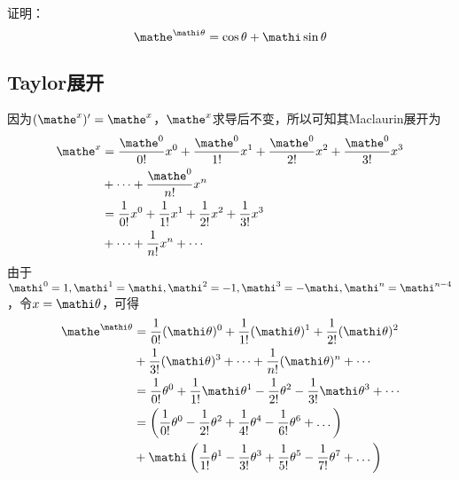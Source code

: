 

证明：
\[ \mathe^{\mathi\theta} = \cos\theta + \mathi\sin\theta \]

\subsection{Taylor展开}

因为$(\mathe^x)' = \mathe^x$，$\mathe^x$求导后不变，所以可知其Maclaurin展开为
\begin{align*}
  \mathe^x &= \frac{\mathe^0}{0!}x^0 + \frac{\mathe^0}{1!}x^1 + \frac{\mathe^0}{2!}x^2 + \frac{\mathe^0}{3!}x^3 \\
  &+ \dots + \frac{\mathe^0}{n!}x^n \\
  &= \frac1{0!}x^0 + \frac1{1!}x^1 + \frac1{2!}x^2 + \frac1{3!}x^3 \\
  &+ \dots + \frac1{n!}x^n + \cdots \\
\end{align*}
由于$\mathi^0 = 1, \mathi^1 = \mathi, \mathi^2 = -1, \mathi^3 = -\mathi, \mathi^n = \mathi^{n - 4}$，令$x = \mathi\theta$，可得
\begin{align*}
  \mathe^{\mathi\theta} &= \frac1{0!}(\mathi\theta)^0 + \frac1{1!}(\mathi\theta)^1 + \frac1{2!}(\mathi\theta)^2 \\
  &+ \frac1{3!}(\mathi\theta)^3 + \dots + \frac1{n!}(\mathi\theta)^n + \cdots \\
  &= \frac1{0!}\theta^0 + \frac1{1!}\mathi\theta^1 - \frac1{2!}\theta^2 - \frac1{3!}\mathi\theta^3 + \cdots \\
  &= \left(\frac1{0!}\theta^0 - \frac1{2!}\theta^2 + \frac1{4!}\theta^4 - \frac1{6!}\theta^6 + \dots\right) \\
  &+ \mathi\left(\frac1{1!}\theta^1 - \frac1{3!}\theta^3 + \frac1{5!}\theta^5 - \frac1{7!}\theta^7 + \dots\right) \\
\end{align*}

